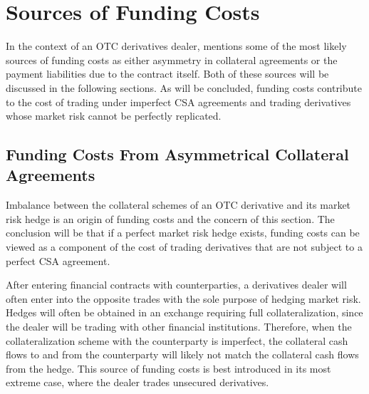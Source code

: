 \documentclass[main.tex]{subfiles}
\begin{document}
    \section{Sources of Funding Costs}
        In the context of an OTC derivatives dealer, 
        \textcite{Ruiz2013FVA} mentions some of the most likely sources of funding costs as
        either asymmetry in collateral agreements or the payment liabilities due to the contract itself.
        Both of these sources will be discussed in the following sections.
        As will be concluded, funding costs contribute to the cost of trading under imperfect CSA agreements 
        and trading derivatives whose market risk cannot be perfectly replicated.

    \subsection{Funding Costs From Asymmetrical Collateral Agreements}
    \label{sec:funding-asymmetric-collateral}
        Imbalance between the collateral schemes of an OTC derivative and its market risk hedge
        is an origin of funding costs and the concern of this section.
        The conclusion will be that if a perfect market risk hedge exists, funding costs can be viewed 
        as a component of the cost of trading derivatives that are not subject to a perfect CSA agreement.

        After entering financial contracts with counterparties,
        a derivatives dealer will often enter into the opposite trades
        with the sole purpose of hedging market risk.
        Hedges will often be obtained in an exchange requiring full collateralization,
        since the dealer will be trading with other financial institutions.
        Therefore, when the collateralization scheme with the counterparty is imperfect, 
        the collateral cash flows to and from the counterparty will likely not match the collateral cash flows from the hedge.
        This source of funding costs is best introduced in its most extreme case, 
        where the dealer trades unsecured derivatives. 
\end{document}
